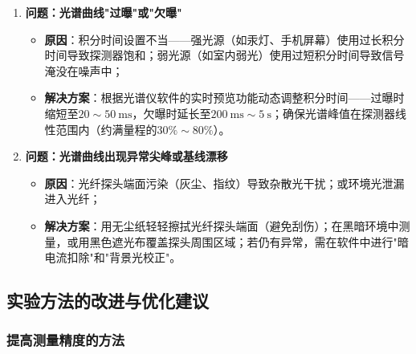 \documentclass[11pt]{article}
\begin{document}
\begin{enumerate}
    \item \textbf{问题：光谱曲线"过曝"或"欠曝"}
    \begin{itemize}
        \item \textbf{原因}：积分时间设置不当——强光源（如汞灯、手机屏幕）使用过长积分时间导致探测器饱和；弱光源（如室内弱光）使用过短积分时间导致信号淹没在噪声中；
        \item \textbf{解决方案}：根据光谱仪软件的实时预览功能动态调整积分时间——过曝时缩短至$20 \sim 50\ \text{ms}$，欠曝时延长至$200\ \text{ms} \sim 5\ \text{s}$；确保光谱峰值在探测器线性范围内（约满量程的$30\% \sim 80\%$）。
    \end{itemize}
    
    \item \textbf{问题：光谱曲线出现异常尖峰或基线漂移}
    \begin{itemize}
        \item \textbf{原因}：光纤探头端面污染（灰尘、指纹）导致杂散光干扰；或环境光泄漏进入光纤；
        \item \textbf{解决方案}：用无尘纸轻轻擦拭光纤探头端面（避免刮伤）；在黑暗环境中测量，或用黑色遮光布覆盖探头周围区域；若仍有异常，需在软件中进行"暗电流扣除"和"背景光校正"。
    \end{itemize}
\end{enumerate}

\subsection{实验方法的改进与优化建议}

\subsubsection{提高测量精度的方法}
\end{document}
